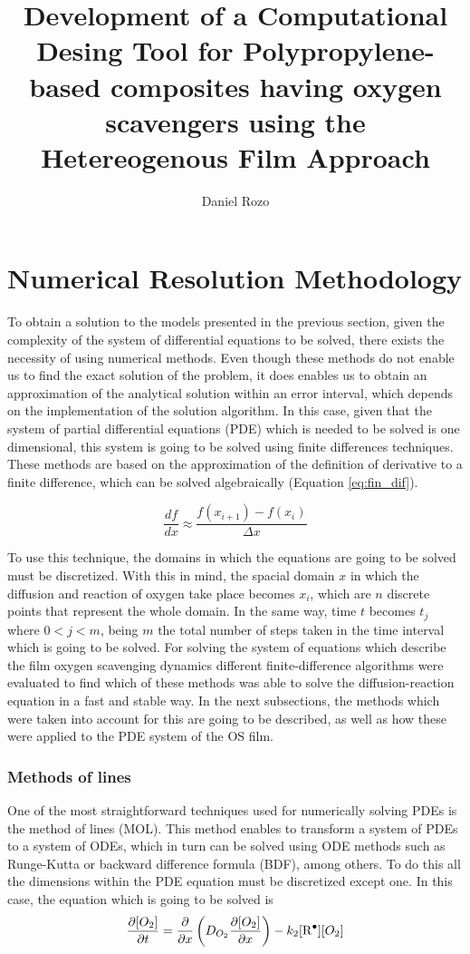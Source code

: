 \documentclass[twoside,11pt]{report}
\title{Development of a Computational Desing Tool for Polypropylene-based composites having oxygen scavengers using the Hetereogenous Film Approach}
\author{Daniel Rozo}
\date{\Today}
\newcounter{reaction}
\begin{document}
\section{Numerical Resolution Methodology}\label{subsec:numerical_methodology.}
To obtain a solution to the models presented in  the previous section, given the complexity of the system of differential equations to be solved, there exists the necessity of using numerical methods. Even though these methods do not enable us to find the exact solution of the problem, it does enables us to obtain an approximation of the analytical solution within an error interval, which depends on the implementation of the solution algorithm. In this case, given that the system of partial differential equations (PDE) which is needed to be solved is one dimensional, this system is going to be solved using finite differences techniques. These methods are based on the approximation of the definition of derivative to a finite difference, which can be solved algebraically (Equation \ref{eq:fin_dif}).

\begin{equation}
    \frac{df}{dx}\approx \frac{f(x_{i+1})-f(x_{i}) }{\Delta x}
    \label{eq:fin_dif}
\end{equation}

To use this technique, the domains in which the equations are going to be solved must be discretized. With this in mind, the spacial domain $x$ in which the diffusion and reaction of oxygen take place becomes $x_i$, which are $n$ discrete points that represent the whole domain. In the same way, time $t$ becomes $t_j$ where $0<j<m$, being $m$ the total number of steps taken in the time interval which is going to be solved. For solving the system of equations which describe the film oxygen scavenging dynamics different finite-difference algorithms were evaluated to find which of these methods was able to solve the diffusion-reaction equation in a fast and stable way. In the next subsections, the methods which were taken into account for this are going to be described, as well as how these were applied to the PDE system of the OS film. 

\subsubsection{Methods of lines}
One of the most straightforward techniques used for numerically solving PDEs is the method of lines (MOL). This method enables to transform a system of PDEs to a system of ODEs, which in turn can be solved using ODE methods such as Runge-Kutta or backward difference formula (BDF), among others. To do this all the dimensions within the PDE equation must be discretized except one. In this case, the equation which is going to be solved is
\begin{equation}
     \frac{\partial [O_2]}{\partial t}= \frac{\partial}{\partial x} \left(D_{O_2}\frac{\partial [O_2] }{\partial x}\right) -k_2[\ce{R^.}][O_2]
     \label{eq:mass_bal_dif_reacc}
\end{equation}
\end{document}
